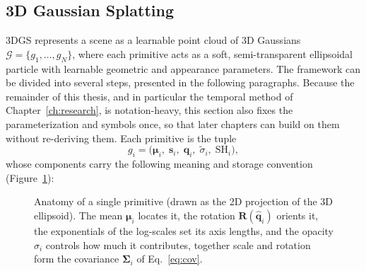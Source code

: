 \subsection{3D Gaussian Splatting}
\label{sec:notation}

3DGS represents a scene as a learnable point cloud of 3D Gaussians $\mathcal{G}
= \{g_1, \dots, g_N\}$, where each primitive acts as a soft, semi-transparent
ellipsoidal particle with learnable geometric and appearance parameters. The
framework can be divided into several steps, presented in the following
paragraphs. Because the remainder of this thesis, and in particular the temporal
method of Chapter~\ref{ch:research}, is notation-heavy, this section also fixes
the parameterization and symbols once, so that later chapters can build on them
without re-deriving them. Each primitive is the tuple
\begin{equation}
    g_i = \big(\boldsymbol{\mu}_i,\; \mathbf{s}_i,\; \mathbf{q}_i,\; \tilde\sigma_i,\; \mathrm{SH}_i\big),
\end{equation}
whose components carry the following meaning and storage convention
(Figure~\ref{fig:gaussian}):

\begin{figure}[!ht]
    \centering
    
    \caption{Anatomy of a single primitive (drawn as the 2D projection of the 3D
    ellipsoid). The mean $\boldsymbol{\mu}_i$ locates it, the rotation
    $\mathbf{R}(\hat{\mathbf{q}}_i)$ orients it, the exponentials of the log-scales
    set its axis lengths, and the opacity $\sigma_i$ controls how much it
    contributes, together scale and rotation form the covariance
    $\boldsymbol{\Sigma}_i$ of Eq.~\eqref{eq:cov}.}
    \label{fig:gaussian}
\end{figure}

